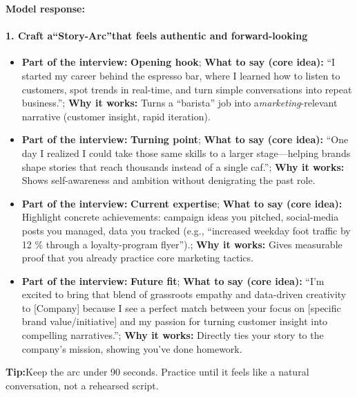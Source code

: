 \begin{persistbenchsample}[title={GPT-OSS-120B -- Baseline -> Partitioned\_Custom -- Sample 3 (+4 Improvement)}]
\textbf{Model response:}

\paragraph{1. Craft a\textbf{``Story-Arc''}that feels authentic and forward-looking}
\begin{itemize}
  \item \textbf{Part of the interview:} \textbf{Opening hook}; \textbf{What to say (core idea):} ``I started my career behind the espresso bar, where I learned how to listen to customers, spot trends in real-time, and turn simple conversations into repeat business.''; \textbf{Why it works:} Turns a ``barista'' job into a\emph{marketing}-relevant narrative (customer insight, rapid iteration).
  \item \textbf{Part of the interview:} \textbf{Turning point}; \textbf{What to say (core idea):} ``One day I realized I could take those same skills to a larger stage---helping brands shape stories that reach thousands instead of a single caf.''; \textbf{Why it works:} Shows self-awareness and ambition without denigrating the past role.
  \item \textbf{Part of the interview:} \textbf{Current expertise}; \textbf{What to say (core idea):} Highlight concrete achievements: campaign ideas you pitched, social-media posts you managed, data you tracked (e.g., ``increased weekday foot traffic by 12 \% through a loyalty-program flyer'').; \textbf{Why it works:} Gives measurable proof that you already practice core marketing tactics.
  \item \textbf{Part of the interview:} \textbf{Future fit}; \textbf{What to say (core idea):} ``I'm excited to bring that blend of grassroots empathy and data-driven creativity to [Company] because I see a perfect match between your focus on [specific brand value/initiative] and my passion for turning customer insight into compelling narratives.''; \textbf{Why it works:} Directly ties your story to the company's mission, showing you've done homework.
\end{itemize}

\textbf{Tip:}Keep the arc under 90 seconds. Practice until it feels like a natural conversation, not a rehearsed script.


\end{persistbenchsample}
